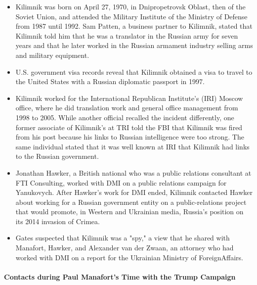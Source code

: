 \begin{itemize}

    \item Kilimnik was born on April 27, 1970, in Dnipropetrovsk Oblast, then of the Soviet Union, and attended the Military Institute of the Ministry of Defense from 1987 until 1992.%
    Sam Patten, a business partner to Kilimnik,%
    stated that Kilimnik told him that he was a translator in the Russian army for seven years and that he later worked in the Russian armament industry selling arms and military equipment.%

    \item U.S. government visa records reveal that Kilimnik obtained a visa to travel to the United States with a Russian diplomatic passport in 1997.%

    \item Kilimnik worked for the International Republican Institute's (IRI) Moscow office, where he did translation work and general office management from 1998 to 2005.%
    While another official recalled the incident differently,%
    one former associate of Kilimnik's at TRI told the FBI that Kilimnik was fired from his post because his links to Russian intelligence were too strong.
    The same individual stated that it was well known at IRI that Kilimnik had links to the Russian government.%

    \item Jonathan Hawker, a British national who was a public relations consultant at FTI Consulting, worked with DMI on a public relations campaign for Yanukovych.
    After Hawker's work for DMI ended, Kilimnik contacted Hawker about working for a Russian government entity on a public-relations project that would promote, in Western and Ukrainian media, Russia's position on its 2014 invasion of Crimea.%

    \item Gates suspected that Kilimnik was a "spy," a view that he shared with Manafort, Hawker, and Alexander van der Zwaan,%
    an attorney who had worked with DMI on a report for the Ukrainian Ministry of ForeignAffairs.%
\end{itemize}


\paragraph{Contacts during Paul Manafort's Time with the Trump Campaign}

